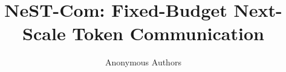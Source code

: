 \documentclass[10pt,journal,letterpaper]{IEEEtran}
\begin{document}
\title{NeST-Com: Fixed-Budget Next-Scale Token Communication}
\author{Anonymous Authors}
\maketitle






\end{document}
